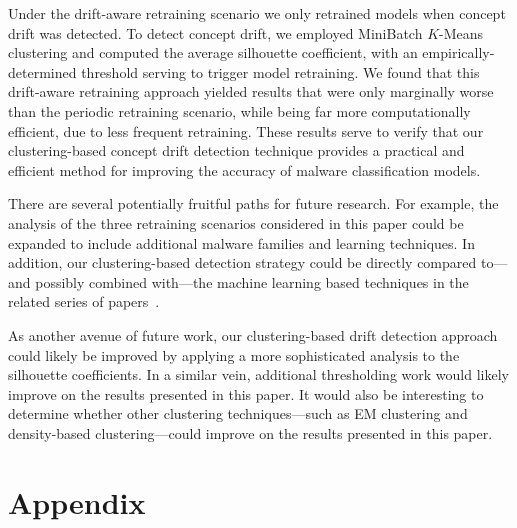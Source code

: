 \documentclass[12pt]{article}
\begin{document}
Under the drift-aware retraining scenario we only retrained models when
concept drift was detected. To detect concept drift, we employed MiniBatch $K$-Means
clustering and computed the average silhouette coefficient, with an empirically-determined
threshold serving to trigger model retraining. We found that this drift-aware retraining
approach yielded results that were only marginally worse than the periodic retraining scenario, while
being far more computationally efficient, due to less frequent retraining.
These results serve to verify that our clustering-based concept drift detection technique 
provides a practical and efficient method for 
improving the accuracy of malware classification models.

There are several potentially fruitful paths for future research. For example,
the analysis of the three retraining scenarios  
considered in this paper could be expanded to include additional malware families and 
learning techniques. In addition, our clustering-based detection strategy 
could be directly compared to---and possibly combined with---the machine 
learning based techniques in the related series of papers~\cite{Sunhera,Lolitha,Mayuri}.

As another avenue of future work, our clustering-based drift detection approach
could likely be improved by applying a more 
sophisticated analysis to the silhouette coefficients. In a similar vein, additional
thresholding work would likely improve on the results presented in this paper. It would also
be interesting to determine whether other clustering techniques---such as 
EM clustering and density-based clustering---could 
improve on the results presented in this paper.






\section*{Appendix}\label{app:a}

\setcounter{section}{0}
\renewcommand{\thesection}{\Alph{section}}
\renewcommand{\thesubsection}{A.\arabic{subsection}}
\setcounter{table}{0}
\renewcommand{\thetable}{A.\arabic{table}}
\setcounter{figure}{0}
\renewcommand{\thefigure}{A.\arabic{figure}}
\end{document}
